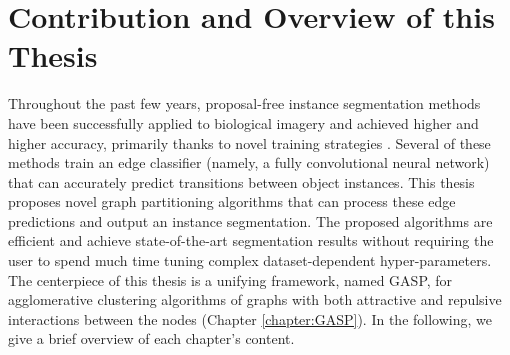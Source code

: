 \newpage
\section{Contribution and Overview of this Thesis}
Throughout the past few years, proposal-free instance segmentation methods have been successfully applied to biological imagery and achieved higher and higher accuracy, primarily thanks to novel training strategies \cite{lee2017superhuman,milletari2016v}. 
Several of these methods train an edge classifier (namely, a fully convolutional neural network) that can accurately predict transitions between object instances. This thesis proposes novel graph partitioning algorithms that can process these edge predictions and output an instance segmentation. The proposed algorithms are efficient and achieve state-of-the-art segmentation results without requiring the user to spend much time tuning complex dataset-dependent hyper-parameters. The centerpiece of this thesis is a unifying framework, named GASP, for agglomerative clustering algorithms of graphs with both attractive and repulsive interactions between the nodes (Chapter \ref{chapter:GASP}). 
In the following, we give a brief overview of each chapter’s content.
\medskip

